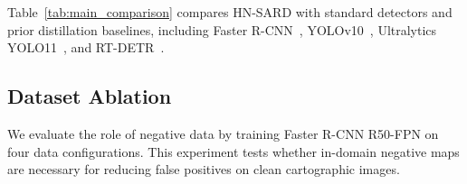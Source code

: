 \documentclass[conference,a4paper]{IEEEtran}
\begin{document}
Table~\ref{tab:main_comparison} compares HN-SARD with standard detectors and prior distillation baselines, including Faster R-CNN~\cite{ren2015faster}, YOLOv10~\cite{wang2024yolov10}, Ultralytics YOLO11~\cite{jocher2024yolo11}, and RT-DETR~\cite{zhao2023rtdetr}.

\begin{table}[!htbp]
\centering
\caption{Main comparison on the test set. HN-SARD is evaluated using both object-level detection metrics and moderation-oriented false-positive metrics.}
\label{tab:main_comparison}
\setlength{\tabcolsep}{2.2pt}
\scriptsize
{}
\end{table}

\subsection{Dataset Ablation}

We evaluate the role of negative data by training Faster R-CNN R50-FPN on four data configurations.
This experiment tests whether in-domain negative maps are necessary for reducing false positives on clean cartographic images.

\begin{table}[!htbp]
\centering
\caption{Dataset ablation. In-domain negative data is expected to reduce false positives on visually similar clean maps.}
\label{tab:dataset_ablation}
\end{table}
\FloatBarrier
\end{document}
